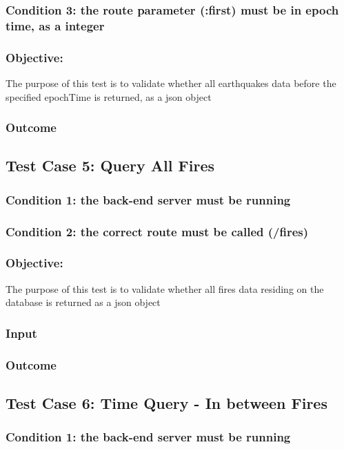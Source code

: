 \subsubsection{Condition 3: the route parameter (:first) must be in epoch time, as a integer}
\subsubsection{Objective:} The purpose of this test is to validate whether all  earthquakes data before the specified epochTime is returned, as a json object
\subsubsection{Outcome}


\subsection{Test Case 5: Query All Fires}
\subsubsection{Condition 1: the back-end server must be running}
\subsubsection{Condition 2: the correct route must be called (/fires)}
\subsubsection{Objective:} The purpose of this test is to validate whether all fires data residing on the database is returned  as a json object
\subsubsection{Input}
\subsubsection{Outcome}

\subsection{Test Case 6: Time Query - In between Fires}

\subsubsection{Condition 1: the back-end server must be running}
